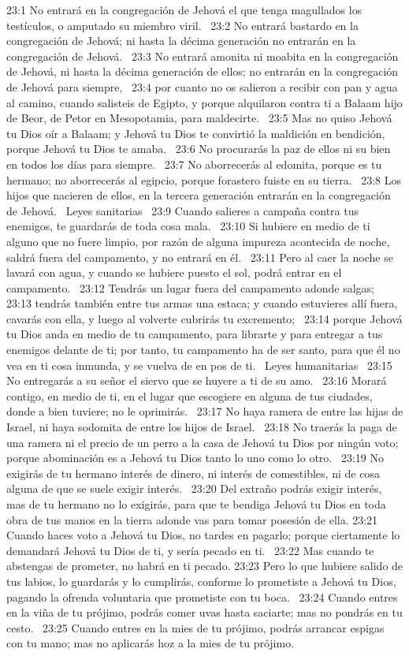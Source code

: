 23:1 No entrará en la congregación de Jehová el que tenga magullados los testículos, o amputado su miembro viril.  
23:2 No entrará bastardo en la congregación de Jehová; ni hasta la décima generación no entrarán en la congregación de Jehová.  
23:3 No entrará amonita ni moabita en la congregación de Jehová, ni hasta la décima generación de ellos; no entrarán en la congregación de Jehová para siempre,  
23:4 por cuanto no os salieron a recibir con pan y agua al camino, cuando salisteis de Egipto, y porque alquilaron contra ti a Balaam hijo de Beor, de Petor en Mesopotamia, para maldecirte.  
23:5 Mas no quiso Jehová tu Dios oír a Balaam; y Jehová tu Dios te convirtió la maldición en bendición, porque Jehová tu Dios te amaba.  
23:6 No procurarás la paz de ellos ni su bien en todos los días para siempre.  
23:7 No aborrecerás al edomita, porque es tu hermano; no aborrecerás al egipcio, porque forastero fuiste en su tierra.  
23:8 Los hijos que nacieren de ellos, en la tercera generación entrarán en la congregación de Jehová.  
Leyes sanitarias  
23:9 Cuando salieres a campaña contra tus enemigos, te guardarás de toda cosa mala.  
23:10 Si hubiere en medio de ti alguno que no fuere limpio, por razón de alguna impureza acontecida de noche, saldrá fuera del campamento, y no entrará en él.  
23:11 Pero al caer la noche se lavará con agua, y cuando se hubiere puesto el sol, podrá entrar en el campamento.  
23:12 Tendrás un lugar fuera del campamento adonde salgas;  
23:13 tendrás también entre tus armas una estaca; y cuando estuvieres allí fuera, cavarás con ella, y luego al volverte cubrirás tu excremento;  
23:14 porque Jehová tu Dios anda en medio de tu campamento, para librarte y para entregar a tus enemigos delante de ti; por tanto, tu campamento ha de ser santo, para que él no vea en ti cosa inmunda, y se vuelva de en pos de ti.  
Leyes humanitarias  
23:15 No entregarás a su señor el siervo que se huyere a ti de su amo.  
23:16 Morará contigo, en medio de ti, en el lugar que escogiere en alguna de tus ciudades, donde a bien tuviere; no le oprimirás.  
23:17 No haya ramera de entre las hijas de Israel, ni haya sodomita de entre los hijos de Israel.  
23:18 No traerás la paga de una ramera ni el precio de un perro a la casa de Jehová tu Dios por ningún voto; porque abominación es a Jehová tu Dios tanto lo uno como lo otro.  
23:19 No exigirás de tu hermano interés de dinero, ni interés de comestibles, ni de cosa alguna de que se suele exigir interés.  
23:20 Del extraño podrás exigir interés, mas de tu hermano no lo exigirás, para que te bendiga Jehová tu Dios en toda obra de tus manos en la tierra adonde vas para tomar posesión de ella. 
23:21 Cuando haces voto a Jehová tu Dios, no tardes en pagarlo; porque ciertamente lo demandará Jehová tu Dios de ti, y sería pecado en ti.  
23:22 Mas cuando te abstengas de prometer, no habrá en ti pecado. 
23:23 Pero lo que hubiere salido de tus labios, lo guardarás y lo cumplirás, conforme lo prometiste a Jehová tu Dios, pagando la ofrenda voluntaria que prometiste con tu boca.  
23:24 Cuando entres en la viña de tu prójimo, podrás comer uvas hasta saciarte; mas no pondrás en tu cesto.  
23:25 Cuando entres en la mies de tu prójimo, podrás arrancar espigas con tu mano; mas no aplicarás hoz a la mies de tu prójimo. 
